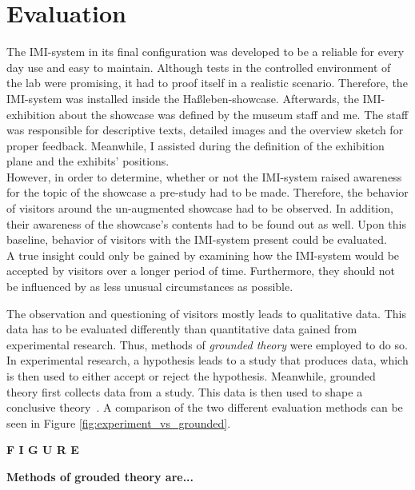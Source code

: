 \chapter{Evaluation}
\label{evaluation}

The \ac{IMI}-system in its final configuration was developed to be a reliable for every day use and easy to maintain. Although tests in the controlled environment of the lab were promising, it had to proof itself in a realistic scenario. Therefore, the \ac{IMI}-system was installed inside the Haßleben-showcase. Afterwards, the \ac{IMI}-exhibition about the showcase was defined by the museum staff and me. The staff was responsible for descriptive texts, detailed images and the overview sketch for proper feedback. Meanwhile, I assisted during the definition of the exhibition plane and the exhibits' positions.
\\
However, in order to determine, whether or not the \ac{IMI}-system raised awareness for the topic of the showcase a pre-study had to be made. Therefore, the behavior of visitors around the un-augmented showcase had to be observed. In addition, their awareness of the showcase's contents had to be found out as well. Upon this baseline, behavior of visitors with the \ac{IMI}-system present could be evaluated.
\\
A true insight could only be gained by examining how the \ac{IMI}-system would be accepted by visitors over a longer period of time. Furthermore, they should not be influenced by as less unusual circumstances as possible.

The observation and questioning of visitors mostly leads to qualitative data. This data has to be evaluated differently than quantitative data gained from experimental research. Thus, methods of \textit{grounded theory} were employed to do so. In experimental research, a hypothesis leads to a study that produces data, which is then used to either accept or reject the hypothesis. Meanwhile, grounded theory first collects data from a study. This data is then used to shape a conclusive theory~\cite{GroundedTheory}. A comparison of the two different evaluation methods can be seen in Figure \ref{fig:experiment_vs_grounded}.

\textbf{F I G U R E}
 
\textbf{Methods of grouded theory are...}

